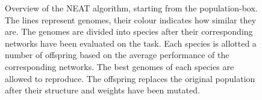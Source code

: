 \begin{figure}[htb]
\begin{mdframed}
\begin{tikzpicture}
    \end{tikzpicture}
    \end{mdframed}
    \caption{Overview of the NEAT algorithm, starting from the population-box. The lines represent genomes,
    their colour indicates how similar they are.
    The genomes are divided into species after their corresponding networks
    have been evaluated on the task. Each species is allotted a number of offspring based on
    the average performance of the corresponding networks. The best genomes of each species are allowed
    to reproduce. The offspring replaces the original population after their structure and weights have been mutated.}
    \label{neat_overview}
\end{figure}